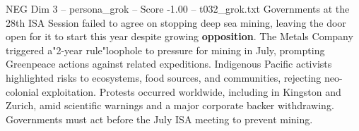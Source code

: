 \begin{textsample}{NEG Dim 3 – persona\_grok – Score -1.00 – t032\_grok.txt}  \label{ex:f3_neg_027}
Governments at the 28th ISA Session failed to agree on stopping deep sea mining, leaving the door open for it to start this year despite growing \textbf{opposition}.
The Metals Company triggered a"2-year rule"loophole to pressure for mining in July, prompting Greenpeace actions against related expeditions.
Indigenous Pacific activists highlighted risks to ecosystems, food sources, and communities, rejecting neo-colonial exploitation.
Protests occurred worldwide, including in Kingston and Zurich, amid scientific warnings and a major corporate backer withdrawing.
Governments must act before the July ISA meeting to prevent mining.

\end{textsample}

